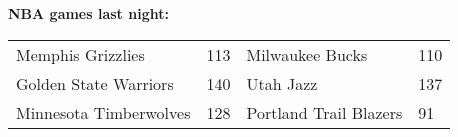 \textbf{NBA games last night:}
\begin{tabular}{llll}
\toprule
     Memphis Grizzlies & 113 &        Milwaukee Bucks & 110 \\
 Golden State Warriors & 140 &              Utah Jazz & 137 \\
Minnesota Timberwolves & 128 & Portland Trail Blazers &  91 \\
\bottomrule
\end{tabular}
